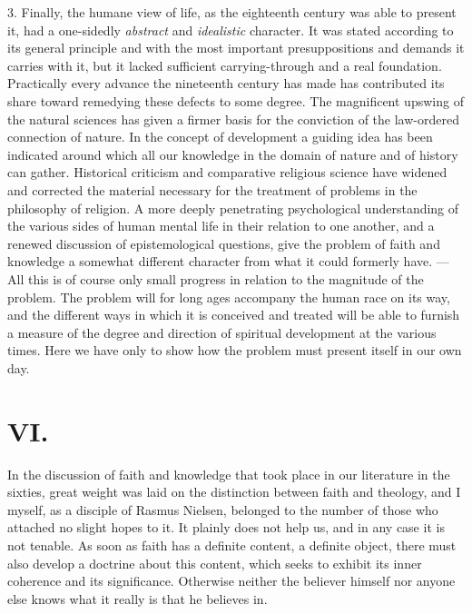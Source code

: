 \documentclass[12pt,a4paper,openany]{book}
\newcommand{\opage}[1]{\marginnote{\footnotesize\textit{[#1]}}}
\begin{document}
3. Finally, the humane view of life, as the eighteenth century was
able to present it, had a one-sidedly \emph{abstract} and \emph{idealistic} character. It
was stated according to its general principle and with the most important
presuppositions and demands it carries with it, but it lacked sufficient
carrying-through and a real foundation. Practically every
\opage{209}advance the
nineteenth century has made has contributed its share toward remedying these
defects to some degree. The magnificent upswing of the natural sciences has
given a firmer basis for the conviction of the law-ordered connection of
nature. In the concept of development a guiding idea has been indicated around
which all our knowledge in the domain of nature and of history can gather.
Historical criticism and comparative religious science have widened and
corrected the material necessary for the treatment of problems in the
philosophy of religion. A more deeply penetrating psychological understanding
of the various sides of human mental life in their relation to one another,
and a renewed discussion of epistemological questions, give the problem of
faith and knowledge a somewhat different character from what it could formerly
have. --- All this is of course only small progress in relation to the
magnitude of the problem. The problem will for long ages accompany the human
race on its way, and the different ways in which it is conceived and treated
will be able to furnish a measure of the degree and direction of spiritual
development at the various times. Here we have only to show how the problem
must present itself in our own day.

\section*{VI.}

In the discussion of faith and knowledge that took place in our literature in
the sixties, great weight was laid on the distinction between faith and
theology, and I myself, as a disciple of Rasmus Nielsen, belonged to the number
of those who attached no slight hopes to it. It plainly does not help us, and
in any case it is not tenable. As soon as faith has a definite content, a
definite object, there must also develop a doctrine about this content, which
seeks to exhibit its inner coherence and its significance. Otherwise neither
the believer himself nor anyone else knows what it really is that he believes
in.
\end{document}
